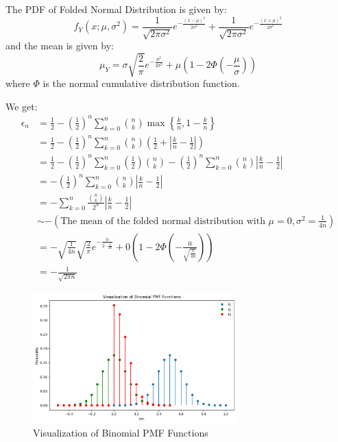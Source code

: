 \documentclass[11pt]{article}
\numberwithin{equation}{section}
\theoremstyle{boldStyle}
\begin{document}
\bigbreak

The PDF of Folded Normal Distribution is given by:
\[
    f_{Y}(x; \mu, \sigma^2) = \frac{1}{\sqrt{2\pi \sigma^2}} e^{-\frac{(x - \mu)^2}{2\sigma^2}} + \frac{1}{\sqrt{2\pi \sigma^2}} e^{-\frac{(x + \mu)^2}{2\sigma^2}}
\]
and the mean is given by:
\[
    \mu_{Y} = \sigma \sqrt{\frac{2}{\pi}} e^{-\frac{\mu^2}{2\sigma^2}} + \mu \left(1 - 2 \Phi\left(-\frac{\mu}{\sigma}\right)\right)
\]
where $\Phi$ is the normal cumulative distribution function.

\bigbreak

We get:
\begin{align*}
    \epsilon_n &=  \frac{1}{2} - \left(\frac{1}{2}\right)^n \sum_{k=0}^n \binom{n}{k} \max \left\{ \frac{k}{n}, 1 - \frac{k}{n} \right\} \\
    &= \frac{1}{2} - \left(\frac{1}{2}\right)^n \sum_{k=0}^n \binom{n}{k} \left( \frac{1}{2} + \left| \frac{k}{n} - \frac{1}{2} \right| \right) \\
    &= \frac{1}{2} - \left(\frac{1}{2}\right)^n \sum_{k=0}^n \left(\frac{1}{2}\right) \binom{n}{k}  - \left(\frac{1}{2}\right)^n \sum_{k=0}^n \binom{n}{k} \left| \frac{k}{n} - \frac{1}{2} \right| \\
    &= - \left(\frac{1}{2}\right)^n \sum_{k=0}^n \binom{n}{k} \left| \frac{k}{n} - \frac{1}{2} \right| \\
    &= - \sum_{k=0}^n  \frac{\binom{n}{k}}{2^n} \left| \frac{k}{n} - \frac{1}{2} \right| \\
    &\sim - \left( \text{The mean of the folded normal distribution with } \mu = 0, \sigma^2 = \frac{1}{4n} \right) \\
    &= - \sqrt{\frac{1}{4n}} \sqrt{\frac{2}{\pi}} e^{-\frac{0}{2 \cdot \frac{1}{4n}}} + 0 \left(1 - 2 \Phi\left(-\frac{0}{\sqrt{\frac{1}{4n}}}\right)\right) \\
    &= - \frac{1}{\sqrt{2\pi n}}
\end{align*}

\begin{figure}[H]
    \centering
    \includegraphics[width=0.7\textwidth]{figs/Visualization_of_Binomial_PMF_Functions.png}
    \caption{Visualization of Binomial PMF Functions}
    \label{fig:binomial_pmf}
\end{figure}
\end{document}
